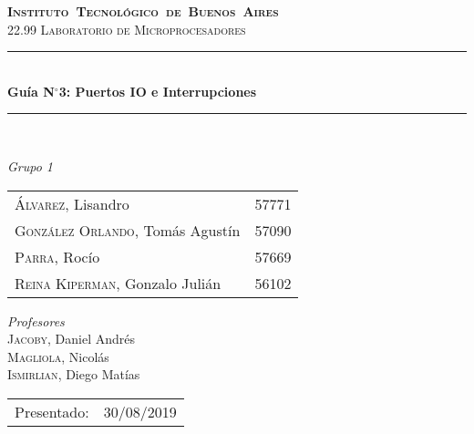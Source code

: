 \begin{titlepage}

\def\titulo{Gu\'ia N$^\circ$3: Puertos IO e Interrupciones}
\def\fecha-entrega{30/08/2019}



\newcommand{\HRule}{\rule{\linewidth}{0.5mm}}
\center
\mbox{\textsc{\LARGE \bfseries {Instituto Tecnol\'ogico de Buenos Aires}}}\\[1.5cm]
\textsc{\Large 22.99 Laboratorio de Microprocesadores}\\[0.5cm]


\HRule \\[0.6cm]
{ \Huge \bfseries \titulo }\\[0.4cm] %
\HRule \\[1.5cm]


{\large

\emph{Grupo 1}\\
\vspace{3px}

\begin{tabular}{lr} 	
\textsc{\'Alvarez}, Lisandro  & 57771 \\
\textsc{Gonz\'alez Orlando}, Tom\'as Agust\'in  & 57090 \\
\textsc{Parra}, Roc\'io  & 57669 \\
\textsc{Reina Kiperman}, Gonzalo Juli\'an  & 56102 \\
\end{tabular}

\vspace{30px}

\emph{Profesores}\\
\vspace{3px}
\textsc{Jacoby}, Daniel Andr\'es\\ 	
\textsc{Magliola}, Nicol\'as\\ 	
\textsc{Ismirlian}, Diego Mat\'ias\\ 	

\vspace{120px}

\begin{tabular}{ll}

Presentado: & \fecha-entrega\\

\end{tabular}

}

\vfill

\end{titlepage}